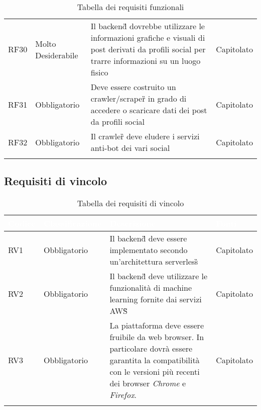 {\begin{longtable}{C{.15\freewidth} C{.2\freewidth} C{.528\freewidth} C{.15\freewidth}}
      RF30 & Molto Desiderabile & Il backend\G{} dovrebbe utilizzare le informazioni grafiche e visuali di post derivati da profili social per trarre informazioni su un luogo fisico & Capitolato \\
      RF31 & Obbligatorio & Deve essere costruito un crawler/scraper\G{} in grado di accedere o scaricare dati dei post da profili social & Capitolato \\
      RF32 & Obbligatorio & Il crawler\G{} deve eludere i servizi anti-bot dei vari social & Capitolato \\
      \bottomrule
      \caption{Tabella dei requisiti funzionali}
      \end{longtable}
}
\subsection{Requisiti di vincolo}
{
      \setlength{\freewidth}{\dimexpr\textwidth-10\tabcolsep}
      \renewcommand{\arraystretch}{1.5}
      \centering
      \setlength{\aboverulesep}{0pt}
      \setlength{\belowrulesep}{0pt}
      \begin{longtable}{C{.15\freewidth} C{.2\freewidth} C{.528\freewidth} C{.15\freewidth}}
         \toprule
      \textcolor{white}{\textbf{Codice}}&
      \textcolor{white}{\textbf{Classificazione}}&
      \textcolor{white}{\textbf{Descrizione}}&
      \textcolor{white}{\textbf{Fonti}}\\	
      \toprule
      \endhead
      RV1 & Obbligatorio & Il backend\G{} deve essere implementato secondo un'architettura serverless\G{} & Capitolato \\
      RV2 & Obbligatorio & Il backend\G{} deve utilizzare le funzionalità di machine learning fornite dai servizi AWS\G{} & Capitolato \\
      RV3 & Obbligatorio & La piattaforma deve essere fruibile da web browser. In particolare dovrà essere garantita la compatibilità con le versioni più recenti dei browser \textit{Chrome} e \textit{Firefox}. & Capitolato \\
      \bottomrule
      \caption{Tabella dei requisiti di vincolo}
      \end{longtable}
}
